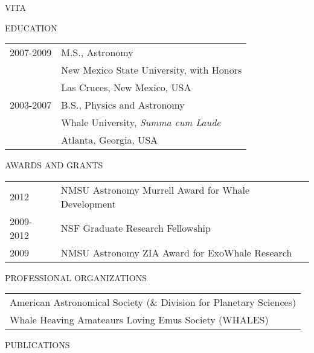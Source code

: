 \begin{center}
 VITA
\end{center}

\medskip

\begin{center}
 EDUCATION
\end{center}


\begin{flushleft}
\begin{tabular}{ll}
2007-2009 &  M.S., Astronomy\\
 & New Mexico State University, with Honors\\
 & Las  Cruces, New Mexico, USA\\
2003-2007 &  B.S., Physics and Astronomy\\
 & Whale University, \emph{Summa cum Laude}\\
 & Atlanta, Georgia, USA
\end{tabular}
\end{flushleft}

\medskip

\begin{center}
AWARDS AND GRANTS
\end{center}
\begin{flushleft}
\begin{tabular}{ll}
2012 & NMSU Astronomy Murrell Award for Whale Development\\
2009-2012 & NSF Graduate Research Fellowship\\
2009 & NMSU Astronomy ZIA Award for ExoWhale Research
\end{tabular}
\end{flushleft}

\medskip

\begin{center}
PROFESSIONAL ORGANIZATIONS
\end{center}
\begin{flushleft}
\begin{tabular}{l}
American Astronomical Society (\& Division for Planetary Sciences)\\
Whale Heaving Amateaurs Loving Emus Society (WHALES)
\end{tabular}
\end{flushleft}

\medskip

\singlespace

\begin{center}
PUBLICATIONS 
\end{center}

